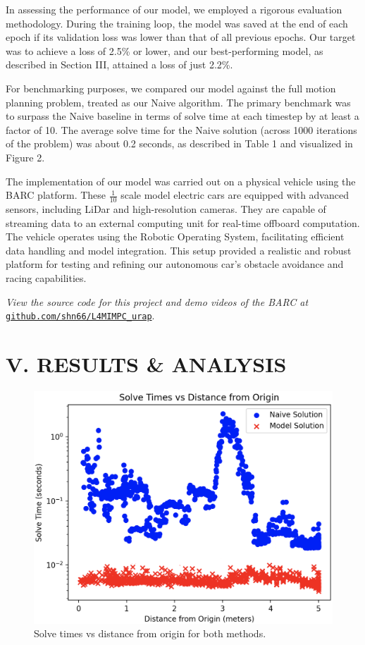 \documentclass[
	letterpaper, %
	10pt, %
	unnumberedsections, %
	twoside, %
]{LTJournalArticle}
\begin{document}
In assessing the performance of our model, we employed a rigorous evaluation methodology. During the training loop, the model was saved at the end of each epoch if its validation loss was lower than that of all previous epochs. Our target was to achieve a loss of 2.5\% or lower, and our best-performing model, as described in Section III, attained a loss of just 2.2\%. 

For benchmarking purposes, we compared our model against the full motion planning problem, treated as our Naive algorithm. The primary benchmark was to surpass the Naive baseline in terms of solve time at each timestep by at least a factor of 10. The average solve time for the Naive solution (across 1000 iterations of the problem) was about 0.2 seconds, as described in Table 1 and visualized in Figure 2.

The implementation of our model was carried out on a physical vehicle using the BARC platform. These \(\frac{1}{10}\) scale model electric cars are equipped with advanced sensors, including LiDar and high-resolution cameras. They are capable of streaming data to an external computing unit for real-time offboard computation. The vehicle operates using the Robotic Operating System, facilitating efficient data handling and model integration. This setup provided a realistic and robust platform for testing and refining our autonomous car's obstacle avoidance and racing capabilities.

\textit{View the source code for this project and demo videos of the BARC at} \texttt{\href{https://github.com/shn66/L4MIMPC_urap}{github.com/shn66/L4MIMPC\_urap}}.

\section{V. RESULTS \& ANALYSIS}

\begin{figure}
	\includegraphics[width=\linewidth]{graph.png}
	\caption{Solve times vs distance from origin for both methods.}
\end{figure}
\end{document}
